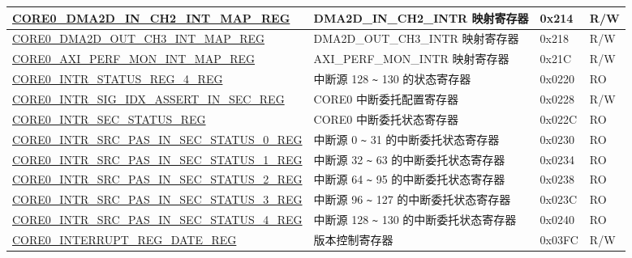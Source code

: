 \begin{longtable}{ | p{8.7cm} | p{6.2cm} | p{1.3cm} | p{1cm} | }
\hyperref[regdesc:CORE0DMA2DINCH2INTMAPREG]{CORE0\_DMA2D\_IN\_CH2\_INT\_MAP\_REG} & DMA2D\_IN\_CH2\_INTR 映射寄存器 & 0x214 & R/W \\ \hline

\hyperref[regdesc:CORE0DMA2DOUTCH3INTMAPREG]{CORE0\_DMA2D\_OUT\_CH3\_INT\_MAP\_REG} & DMA2D\_OUT\_CH3\_INTR 映射寄存器 & 0x218 & R/W \\ \hline

\hyperref[regdesc:CORE0AXIPERFMONINTMAPREG]{CORE0\_AXI\_PERF\_MON\_INT\_MAP\_REG} & AXI\_PERF\_MON\_INTR 映射寄存器 & 0x21C & R/W \\ \hline

\hyperref[regdesc:CORE0INTRSTATUSREG4REG]{CORE0\_INTR\_STATUS\_REG\_4\_REG} & 中断源 128 \verb+~+ 130 的状态寄存器 & 0x0220 & RO \\ \hline

\hyperref[regdesc:CORE0INTRSIGIDXASSERTINSECREG]{CORE0\_INTR\_SIG\_IDX\_ASSERT\_IN\_SEC\_REG} & CORE0 中断委托配置寄存器 & 0x0228 & R/W \\ \hline

\hyperref[regdesc:CORE0INTRSECSTATUSREG]{CORE0\_INTR\_SEC\_STATUS\_REG} & CORE0 中断委托状态寄存器 & 0x022C & RO \\ \hline

\hyperref[regdesc:CORE0INTRSRCPASSINSECSTATUS0REG]{CORE0\_INTR\_SRC\_PAS\_IN\_SEC\_STATUS\_0\_REG} & 中断源 0 \verb+~+ 31 的中断委托状态寄存器 & 0x0230 & RO \\ \hline

\hyperref[regdesc:CORE0INTRSRCPASSINSECSTATUS1REG]{CORE0\_INTR\_SRC\_PAS\_IN\_SEC\_STATUS\_1\_REG} & 中断源 32 \verb+~+ 63 的中断委托状态寄存器 & 0x0234 & RO \\ \hline

\hyperref[regdesc:CORE0INTRSRCPASSINSECSTATUS2REG]{CORE0\_INTR\_SRC\_PAS\_IN\_SEC\_STATUS\_2\_REG} & 中断源 64 \verb+~+ 95 的中断委托状态寄存器 & 0x0238 & RO \\ \hline

\hyperref[regdesc:CORE0INTRSRCPASSINSECSTATUS3REG]{CORE0\_INTR\_SRC\_PAS\_IN\_SEC\_STATUS\_3\_REG} & 中断源 96 \verb+~+ 127 的中断委托状态寄存器 & 0x023C & RO \\ \hline

\hyperref[regdesc:CORE0INTRSRCPASSINSECSTATUS4REG]{CORE0\_INTR\_SRC\_PAS\_IN\_SEC\_STATUS\_4\_REG} & 中断源 128 \verb+~+ 130 的中断委托状态寄存器 & 0x0240 & RO \\ \hline


\hyperref[regdesc:CORE0INTERRUPTREGDATEREG]{CORE0\_INTERRUPT\_REG\_DATE\_REG} & 版本控制寄存器 & 0x03FC & R/W \\ \hline
\end{longtable}
